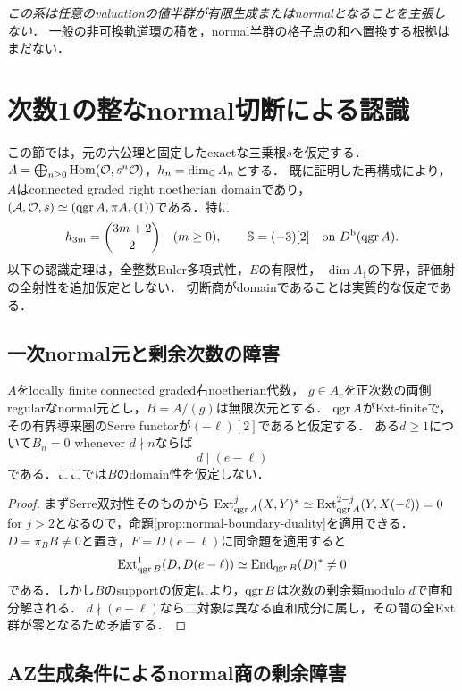 \documentclass[11pt,a4paper]{ltjsarticle}
\begin{document}
\emph{この系は任意のvaluationの値半群が有限生成またはnormalとなることを主張しない．}
一般の非可換軌道環の積を，normal半群の格子点の和へ置換する根拠はまだない．


\section{次数1の整なnormal切断による認識}
\label{sec:normal-boundary}

この節では，元の六公理と固定したexactな三乗根$s$を仮定する．
$A=\bigoplus_{n\geq0}\operatorname{Hom}(\mathcal O,s^n\mathcal O)$，$h_n=\dim_\mathbb C A_n$とする．
既に証明した再構成により，$A$はconnected graded right noetherian domainであり，
$(\mathcal A,\mathcal O,s)\simeq(\operatorname{qgr} A,\pi A,(1))$である．特に
\[
 h_{3m}=\binom{3m+2}{2}\quad(m\geq0),\qquad
 \mathbb S=(-3)[2]\quad\text{on }D^{\mathrm b}(\operatorname{qgr} A).
\]
以下の認識定理は，全整数Euler多項式性，$E$の有限性，
$\dim A_1$の下界，評価射の全射性を追加仮定としない．
切断商がdomainであることは実質的な仮定である．

\subsection{一次normal元と剰余次数の障害}

\begin{lemma}[Serreシフトと切断商の次数support]\label{lem:residue-obstruction}
$A$をlocally finite connected graded右noetherian代数，
$g\in A_e$を正次数の両側regularなnormal元とし，$B=A/(g)$は無限次元とする．
$\operatorname{qgr} A$がExt-finiteで，その有界導来圏のSerre functorが$(-\ell)[2]$であると仮定する．
ある$d\geq1$について$B_n=0$ whenever $d\nmid n$ならば
\begin{equation}\label{eq:residue-divisibility}
 d\mid(e-\ell)
\end{equation}
である．ここでは$B$のdomain性を仮定しない．
\end{lemma}
\begin{proof}
まずSerre双対性そのものから
$\operatorname{Ext}^j_{\operatorname{qgr} A}(X,Y)^*\simeq\operatorname{Ext}^{2-j}_{\operatorname{qgr} A}(Y,X(-\ell))=0$
for $j>2$となるので，命題\ref{prop:normal-boundary-duality}を適用できる．
$D=\pi_BB\ne0$と置き，$F=D(e-\ell)$に同命題を適用すると
\[
 \operatorname{Ext}^1_{\operatorname{qgr} B}(D,D(e-\ell))\simeq\operatorname{End}_{\operatorname{qgr} B}(D)^*\ne0
\]
である．しかし$B$のsupportの仮定により，$\operatorname{qgr} B$は次数の剰余類modulo $d$で直和分解される．
$d\nmid(e-\ell)$なら二対象は異なる直和成分に属し，その間の全Ext群が零となるため矛盾する．
\end{proof}

\subsection{AZ生成条件によるnormal商の剰余障害}
\end{document}
